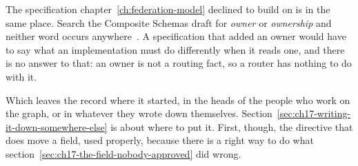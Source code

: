 %
The specification chapter~\ref{ch:federation-model} declined to build on is
in the same place. Search the Composite Schemas draft for \emph{owner} or
\emph{ownership} and neither word occurs
anywhere~\autocite{compositeschemasspec}. A
specification that added an owner would have to say what an implementation
must do differently when it reads one, and there is no answer to that: an
owner is not a routing fact, so a router has nothing to do with it.

%
Which leaves the record where it started, in the heads of the people who work
on the graph, or in whatever they wrote down themselves.
Section~\ref{sec:ch17-writing-it-down-somewhere-else} is about where to put it.
First, though, the directive that does move a field, used properly, because
there is a right way to do what section~\ref{sec:ch17-the-field-nobody-approved}
did wrong.
%
